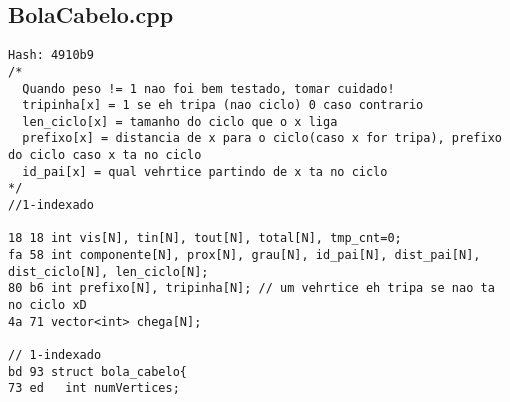 \documentclass[11pt, a4paper, twoside]{article}
\begin{document}
\subsection{BolaCabelo.cpp}
\begin{lstlisting}
Hash: 4910b9
/*
  Quando peso != 1 nao foi bem testado, tomar cuidado!
  tripinha[x] = 1 se eh tripa (nao ciclo) 0 caso contrario
  len_ciclo[x] = tamanho do ciclo que o x liga
  prefixo[x] = distancia de x para o ciclo(caso x for tripa), prefixo do ciclo caso x ta no ciclo
  id_pai[x] = qual vehrtice partindo de x ta no ciclo
*/
//1-indexado

18 18 int vis[N], tin[N], tout[N], total[N], tmp_cnt=0;
fa 58 int componente[N], prox[N], grau[N], id_pai[N], dist_pai[N], dist_ciclo[N], len_ciclo[N];
80 b6 int prefixo[N], tripinha[N]; // um vehrtice eh tripa se nao ta no ciclo xD
4a 71 vector<int> chega[N];

// 1-indexado
bd 93 struct bola_cabelo{
73 ed 	int numVertices;
      	

\end{lstlisting}
\end{document}
